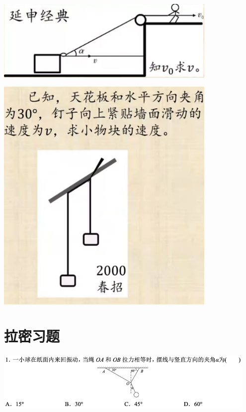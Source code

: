 \documentclass{article}
\begin{document}
\vspace{10em}

\includegraphics[width = 0.8\textwidth]{./pictures/2-2.png}

\vspace{5em}

\includegraphics[width = 0.8\textwidth]{./pictures/2-3.png}

\vspace{5em}

\section{拉密习题}
\includegraphics[width = 0.95\textwidth]{./pictures/3-1.png}

\vspace{5em}
\end{document}
